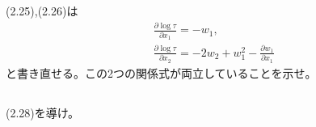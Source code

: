 \documentclass{jsarticle}
\begin{document}
\subsection{}
\begin{shaded}
(2.25),(2.26)は
\begin{align*}
&\frac{\partial \log\tau}{\partial x_{1}}=-w_{1},\\
&\frac{\partial \log\tau}{\partial x_{2}}=-2w_{2}+w_{1}^{2}-\frac{\partial w_{1}}{\partial x_{1}}
\end{align*}
と書き直せる。この2つの関係式が両立していることを示せ。
\end{shaded}
\subsection{}
\begin{shaded}
(2.28)を導け。
\end{shaded}
\end{document}
